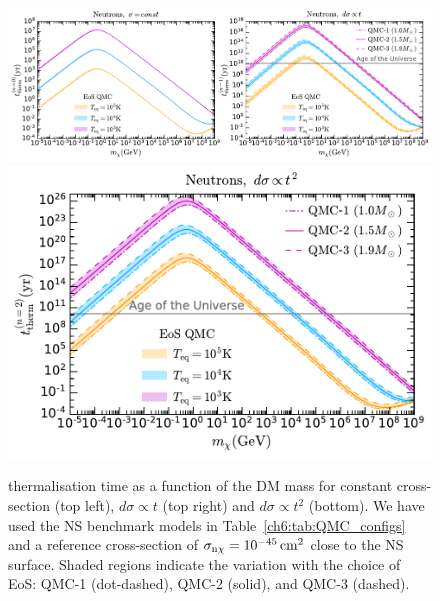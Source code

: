 \begin{figure}[t!bp]
\centering 
  \includegraphics[width=\textwidth]{ttherm_mdm_n0_n1.pdf}
  \includegraphics[width=.525\textwidth]{ttherm_n2_eos.pdf}
  \caption{thermalisation time as a function of the DM mass for constant cross-section (top left), $d\sigma \propto t$ (top right)  and $d\sigma\propto t^2$ (bottom). We have used the NS benchmark models in Table~\ref{ch6:tab:QMC_configs} and a reference cross-section of $\sigma_{\rm n\chi}= 10^{-45}{\rm \,cm}^2$ close to the NS surface. Shaded regions indicate the variation with the choice of EoS: QMC-1 (dot-dashed), QMC-2 (solid), and QMC-3 (dashed). 
  }
  \label{ch6:fig:thermtime}
\end{figure}


